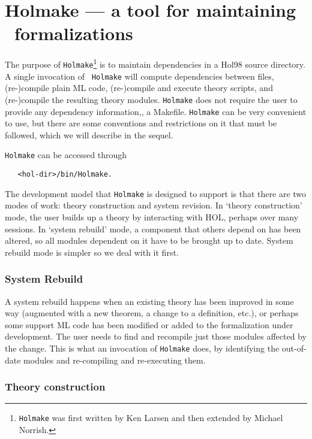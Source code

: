 \section{Holmake --- a tool for maintaining \HOL\ formalizations}\label{Holmake}  

The purpose of \verb+Holmake+\footnote{{\tt Holmake} was first written
  by Ken Larsen and then extended by Michael Norrish.} is to maintain
dependencies in a Hol98 source directory. A single invocation of {\tt
  Holmake} will compute dependencies between files, (re-)compile plain
ML code, (re-)compile and execute theory scripts, and (re-)compile the
resulting theory modules. {\tt Holmake} does not require the user to
provide any dependency information,\eg, a Makefile. {\tt Holmake} can
be very convenient to use, but there are some conventions and
restrictions on it that must be followed, which we will describe in
the sequel.

{\tt Holmake} can be accessed through
\begin{verbatim}
   <hol-dir>/bin/Holmake.
\end{verbatim}

The development model that {\tt Holmake} is designed to support is that
there are two modes of work: theory construction and system revision.
In `theory construction' mode, the user builds up a theory by
interacting with HOL, perhaps over many sessions. In `system rebuild'
mode, a component that others depend on has been altered, so all modules
dependent on it have to be brought up to date. System rebuild mode is
simpler so we deal with it first.  

\subsubsection{System Rebuild}

A system rebuild happens when an existing theory has been improved in
some way (augmented with a new theorem, a change to a definition, etc.),
or perhaps some support ML code has been modified or added to the
formalization under development. The user needs to find and recompile
just those modules affected by the change. This is what an invocation of
{\tt Holmake} does, by identifying the out-of-date modules and
re-compiling and re-executing them.  


\subsubsection{Theory construction}

